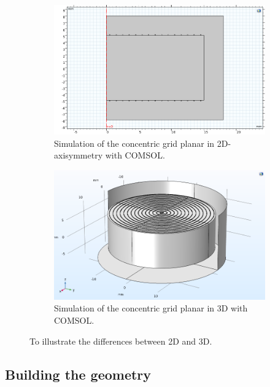 \begin{figure}
\centering
\begin{subfigure}{.5\textwidth}
  \centering
  \includegraphics[width=\linewidth]{Figures/Electrodes/2D_simulation.png}
  \caption{Simulation of the concentric grid planar in 2D-axisymmetry with COMSOL.}
  \label{fig:2D-simulation}
\end{subfigure}%
\begin{subfigure}{0.5\textwidth}
  \centering
  \includegraphics[width=\linewidth]{Figures/Electrodes/3D_simulation.png}
  \caption{Simulation of the concentric grid planar in 3D with COMSOL.}
  \label{fig:3D-simulation}
\end{subfigure}
\caption{To illustrate the differences between 2D and 3D.}
\label{fig:2D-vs-3D}
\end{figure}

\subsection{Building the geometry}


